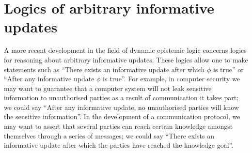 
\section{Logics of arbitrary informative updates}

A more recent development in the field of dynamic epistemic logic concerns logics for reasoning about arbitrary informative updates.
These logics allow one to make statements such as ``There exists an informative update after which $\phi$ is true'' or ``After any informative update $\phi$ is true''.
For example, in computer security we may want to guarantee that a computer system will not leak sensitive information to unauthorised parties as a result of communication it takes part; we could say ``After any informative update, no unauthorised parties will know the sensitive information''.
In the development of a communication protocol, we may want to assert that several parties can reach certain knowledge amongst themselves through a series of messages; we could say ``There exists an informative update after which the parties have reached the knowledge goal''. 

